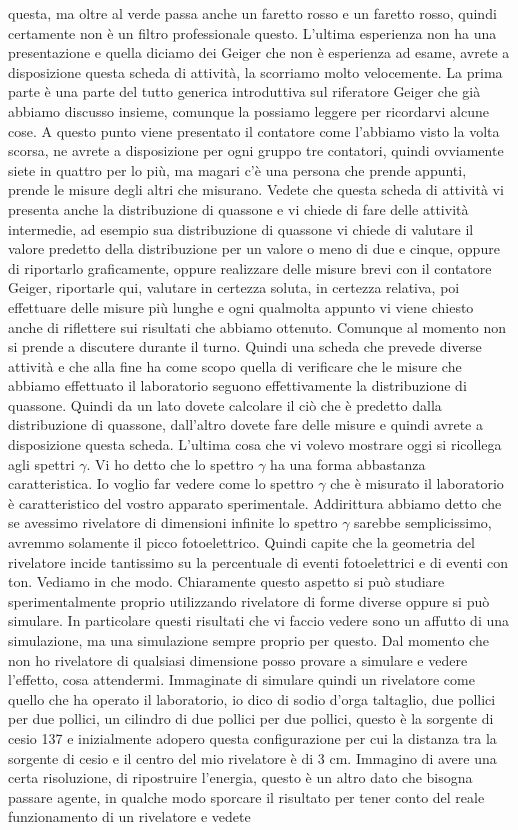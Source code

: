 questa, ma oltre al verde passa anche un faretto rosso e un faretto rosso, quindi certamente non è un filtro professionale questo. L'ultima esperienza non ha una presentazione e quella diciamo dei Geiger che non è esperienza ad esame, avrete a disposizione questa scheda di attività, la scorriamo molto velocemente. La prima parte è una parte del tutto generica introduttiva sul riferatore Geiger che già abbiamo discusso insieme, comunque la possiamo leggere per ricordarvi alcune cose. A questo punto viene presentato il contatore come l'abbiamo visto la volta scorsa, ne avrete a disposizione per ogni gruppo tre contatori, quindi ovviamente siete in quattro per lo più, ma magari c'è una persona che prende appunti, prende le misure degli altri che misurano. Vedete che questa scheda di attività vi presenta anche la distribuzione di quassone e vi chiede di fare delle attività intermedie, ad esempio sua distribuzione di quassone vi chiede di valutare il valore predetto della distribuzione per un valore o meno di due e cinque, oppure di riportarlo graficamente, oppure realizzare delle misure brevi con il contatore Geiger, riportarle qui, valutare in certezza soluta, in certezza relativa, poi effettuare delle misure più lunghe e ogni qualmolta appunto vi viene chiesto anche di riflettere sui risultati che abbiamo ottenuto. Comunque al momento non si prende a discutere durante il turno. Quindi una scheda che prevede diverse attività e che alla fine ha come scopo quella di verificare che le misure che abbiamo effettuato il laboratorio seguono effettivamente la distribuzione di quassone. Quindi da un lato dovete calcolare il ciò che è predetto dalla distribuzione di quassone, dall'altro dovete fare delle misure e quindi avrete a disposizione questa scheda. L'ultima cosa che vi volevo mostrare oggi si ricollega agli spettri $\gamma$. Vi ho detto che lo spettro $\gamma$ ha una forma abbastanza caratteristica. Io voglio far vedere come lo spettro $\gamma$ che è misurato il laboratorio è caratteristico del vostro apparato sperimentale. Addirittura abbiamo detto che se avessimo rivelatore di dimensioni infinite lo spettro $\gamma$ sarebbe semplicissimo, avremmo solamente il picco fotoelettrico. Quindi capite che la geometria del rivelatore incide tantissimo su la percentuale di eventi fotoelettrici e di eventi con ton. Vediamo in che modo. Chiaramente questo aspetto si può studiare sperimentalmente proprio utilizzando rivelatore di forme diverse oppure si può simulare. In particolare questi risultati che vi faccio vedere sono un affutto di una simulazione, ma una simulazione sempre proprio per questo. Dal momento che non ho rivelatore di qualsiasi dimensione posso provare a simulare e vedere l'effetto, cosa attendermi. Immaginate di simulare quindi un rivelatore come quello che ha operato il laboratorio, io dico di sodio d'orga taltaglio, due pollici per due pollici, un cilindro di due pollici per due pollici, questo è la sorgente di cesio 137 e inizialmente adopero questa configurazione per cui la distanza tra la sorgente di cesio e il centro del mio rivelatore è di 3 cm. Immagino di avere una certa risoluzione, di ripostruire l'energia, questo è un altro dato che bisogna passare agente, in qualche modo sporcare il risultato per tener conto del reale funzionamento di un rivelatore e vedete 